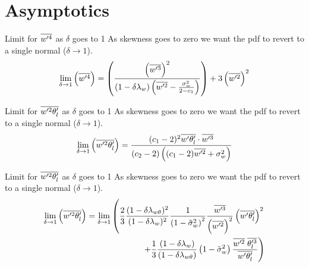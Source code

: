 \documentclass[10pt]{beamer}
\numberwithin{equation}{section}
\begin{document}
    \section{Asymptotics}\label{sec:asymptotics}

    \begin{frame}{Limit for \texorpdfstring{$\overline{w'^4}$}{wprime4bar} as \texorpdfstring{$\delta$}{delta} goes to 1}
        As skewness goes to zero we want the pdf to revert to a single normal ($\delta \to 1$).
        \begin{align}
            \label{eq:limit_wprime4_delta_to_1}
            \lim_{\delta \to 1}\left(\overline{w'^4}\right)
            = \left(
            \frac{
                \left(\overline{w'^3}\right)^2
            }{
                (1 - \delta\lambda_w)
                \left(\overline{w'^2} - \frac{\sigma_w^2}{2 - c_1}\right)
            }
            \right)
            + 3 \left(\overline{w'^2}\right)^2
        \end{align}
    \end{frame}

    \begin{frame}{Limit for \texorpdfstring{$\overline{w'^2 \theta_l'}$}{wprime2thetalbar} as \texorpdfstring{$\delta$}{delta} goes to 1}
        As skewness goes to zero we want the pdf to revert to a single normal ($\delta \to 1$).
        \begin{align}
            \label{eq:limit_wprime2thetalbar_delta_to_1}
            \lim_{\delta \to 1}\left(\overline{w'^2 \theta_l'}\right)
            = \frac{(c_1 - 2)^2 \overline{w' \theta_l'} \cdot \overline{w'^3}}{(c_2 - 2)\left((c_1 - 2)\overline{w'^2} + \sigma_w^2\right)}
        \end{align}
    \end{frame}

    \begin{frame}{Limit for \texorpdfstring{$\overline{w'^2 \theta_l'}$}{wprimethetaltwobar} as \texorpdfstring{$\delta$}{delta} goes to 1}
        As skewness goes to zero we want the pdf to revert to a single normal ($\delta \to 1$).
        \begin{align}
            \label{eq:limit_wprimethetalprime2bar_delta_to_1}
            \lim_{\delta \to 1}\left(\overline{w'^2 \theta_l'}\right)
            = \lim_{\delta \to 1}
            \left(
            \frac{2}{3}
            \frac{(1-\delta \lambda_{w \theta})^2}{(1-\delta \lambda_w)^2}
            \frac{1}{\left( 1 - \tilde{\sigma}_w^2 \right)^2}
            \frac{\overline{w'^3}}{\left(\overline{w'^2} \right)^2}
            \left(\overline{w' \theta_l'} \right)^2
            \right.
            \nonumber\\
            \left.
            +
            \frac{1}{3}
            \frac{(1-\delta \lambda_w)}{(1-\delta \lambda_{w \theta})}
            \left( 1 - \tilde{\sigma}_w^2 \right)
            \frac{\overline{w'^2} \; \overline{\theta_l'^3}}{\overline{w' \theta_l'}}
            \right)
        \end{align}
    \end{frame}
\end{document}
